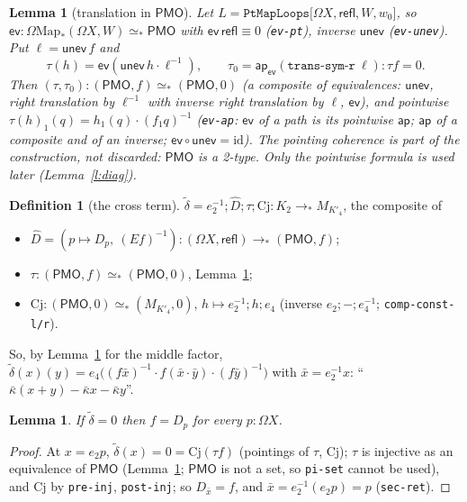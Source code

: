 \documentclass[11pt]{amsart}
\newtheorem{lemma}[theorem]{Lemma}
\theoremstyle{definition}
\newtheorem{definition}[theorem]{Definition}
\theoremstyle{remark}
\newcommand{\Om}{\Omega}
\newcommand{\Map}{\mathrm{Map}_*}
\newcommand{\code}[1]{\texttt{#1}}
\newcommand{\refl}{\mathsf{refl}}
\newcommand{\PMO}{\mathsf{PMO}}
\newcommand{\kb}{\bar\kappa}
\begin{document}
\begin{lemma}[translation in $\PMO$]\label{l:tau}
Let $L=\code{PtMapLoops[}\Om X,\refl,W,w_0\code{]}$, so
$\mathsf{ev}:\Om\Map(\Om X,W)\simeq_*\PMO$ with $\mathsf{ev}\,\refl\equiv0$
(\code{ev-pt}), inverse $\mathsf{unev}$ (\code{ev-unev}). Put
$\ell=\mathsf{unev}\,f$ and
\[\tau(h)=\mathsf{ev}(\mathsf{unev}\,h\cdot\ell^{-1}),\qquad
\tau_0=\mathsf{ap}_{\mathsf{ev}}(\code{trans-sym-r}\ \ell):\tau f=0 .\]
Then $(\tau,\tau_0):(\PMO,f)\simeq_*(\PMO,0)$ (a composite of equivalences:
$\mathsf{unev}$, right translation by $\ell^{-1}$ with inverse right
translation by $\ell$, $\mathsf{ev}$), and pointwise
$\tau(h)_1(q)=h_1(q)\cdot(f_1q)^{-1}$ (\code{ev-ap}: $\mathsf{ev}$ of a path
is its pointwise $\mathsf{ap}$; $\mathsf{ap}$ of a composite and of an
inverse; $\mathsf{ev}\circ\mathsf{unev}=\mathrm{id}$). The pointing
coherence is part of the construction, not discarded: $\PMO$ is a
2-type. Only the pointwise formula is used later (Lemma~\ref{l:diag}).
\end{lemma}

\begin{definition}[the cross term]\label{d:cross}
$\tilde\delta=e_2^{-1};\hat D;\tau;\mathrm{Cj}:K_2\to_*M_{K'_4}$, the composite of
\begin{itemize}
\item $\hat D=(p\mapsto D_p,\ (E f)^{-1}):(\Om X,\refl)\to_*(\PMO,f)$;
\item $\tau:(\PMO,f)\simeq_*(\PMO,0)$, Lemma~\ref{l:tau};
\item $\mathrm{Cj}:(\PMO,0)\simeq_*(M_{K'_4},0)$, $h\mapsto e_2^{-1};h;e_4$
  (inverse $e_2;-;e_4^{-1}$; \code{comp-const-l/r}).
\end{itemize}
So, by Lemma~\ref{l:tau} for the middle factor, $\tilde\delta(x)(y)=e_4\bigl((f\bar x)^{-1}\cdot f(\bar x\cdot\bar y)\cdot(f\bar y)^{-1}\bigr)$
with $\bar x=e_2^{-1}x$: ``$\kb(x+y)-\kb x-\kb y$''.
\end{definition}

\begin{lemma}\label{l:cell}
If $\tilde\delta=0$ then $f=D_p$ for every $p:\Om X$.
\end{lemma}
\begin{proof}
At $x=e_2p$, $\tilde\delta(x)=0=\mathrm{Cj}(\tau f)$ (pointings of $\tau$,
$\mathrm{Cj}$); $\tau$ is injective as an equivalence of $\PMO$ (Lemma~\ref{l:tau};
$\PMO$ is not a set, so \code{pi-set} cannot be used), and $\mathrm{Cj}$ by
\code{pre-inj}, \code{post-inj}; so $D_{\bar x}=f$, and $\bar x=e_2^{-1}(e_2p)=p$
(\code{sec-ret}).
\end{proof}
\end{document}
